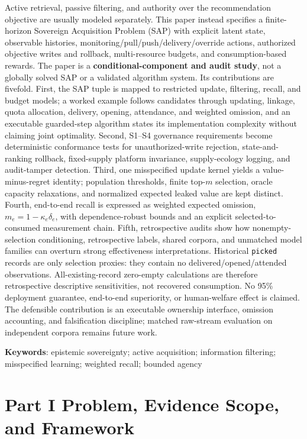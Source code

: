\documentclass[
  11pt]{article}
\begin{document}
Active retrieval, passive filtering, and authority over the
recommendation objective are usually modeled separately. This paper
instead specifies a finite-horizon Sovereign Acquisition Problem (SAP)
with explicit latent state, observable histories,
monitoring/pull/push/delivery/override actions, authorized objective
writes and rollback, multi-resource budgets, and consumption-based
rewards. The paper is a \textbf{conditional-component and audit study},
not a globally solved SAP or a validated algorithm system. Its
contributions are fivefold. First, the SAP tuple is mapped to restricted
update, filtering, recall, and budget models; a worked example follows
candidates through updating, linkage, quota allocation, delivery,
opening, attendance, and weighted omission, and an executable
guarded-step algorithm states its implementation complexity without
claiming joint optimality. Second, S1--S4 governance requirements become
deterministic conformance tests for unauthorized-write rejection,
state-and-ranking rollback, fixed-supply platform invariance,
supply-ecology logging, and audit-tamper detection. Third, one
misspecified update kernel yields a value-minus-regret identity;
population thresholds, finite top-\(m\) selection, oracle capacity
relaxations, and normalized expected leaked value are kept distinct.
Fourth, end-to-end recall is expressed as weighted expected omission,
\(m_e=1-\kappa_e\delta_e\), with dependence-robust bounds and an
explicit selected-to-consumed measurement chain. Fifth, retrospective
audits show how nonempty-selection conditioning, retrospective labels,
shared corpora, and unmatched model families can overturn strong
effectiveness interpretations. Historical \texttt{picked} records are
only selection proxies: they contain no delivered/opened/attended
observations. All-existing-record zero-empty calculations are therefore
retrospective descriptive sensitivities, not recovered consumption. No
95\% deployment guarantee, end-to-end superiority, or human-welfare
effect is claimed. The defensible contribution is an executable
ownership interface, omission accounting, and falsification discipline;
matched raw-stream evaluation on independent corpora remains future
work.

\textbf{Keywords}: epistemic sovereignty; active acquisition;
information filtering; misspecified learning; weighted recall; bounded
agency

\newpage
\tableofcontents
\newpage

\section{Part I Problem, Evidence Scope, and
Framework}\label{part-i-problem-evidence-scope-and-framework}
\end{document}

